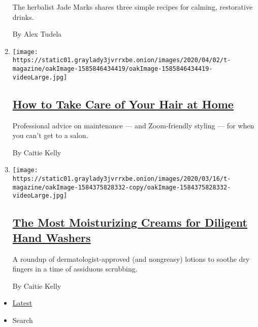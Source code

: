 \begin{enumerate}
  The herbalist Jade Marks shares three simple recipes for calming,
  restorative drinks.

  By Alex Tudela
\item
  \texttt{[image: https://static01.graylady3jvrrxbe.onion/images/2020/04/02/t-magazine/oakImage-1585846434419/oakImage-1585846434419-videoLarge.jpg]}

  \hypertarget{how-to-take-care-of-your-hair-at-home}{%
  \subsection{\texorpdfstring{\href{/2020/04/02/t-magazine/home-hair-care-tips-coronavirus.html}{How
  to Take Care of Your Hair at
  Home}}{How to Take Care of Your Hair at Home}}\label{how-to-take-care-of-your-hair-at-home}}

  Professional advice on maintenance --- and Zoom-friendly styling ---
  for when you can't get to a salon.

  By Caitie Kelly
\item
  \texttt{[image: https://static01.graylady3jvrrxbe.onion/images/2020/03/16/t-magazine/oakImage-1584375828332-copy/oakImage-1584375828332-videoLarge.jpg]}

  \hypertarget{the-most-moisturizing-creams-for-diligent-hand-washers}{%
  \subsection{\texorpdfstring{\href{/2020/03/18/t-magazine/best-moisturizing-creams-lotion.html}{The
  Most Moisturizing Creams for Diligent Hand
  Washers}}{The Most Moisturizing Creams for Diligent Hand Washers}}\label{the-most-moisturizing-creams-for-diligent-hand-washers}}

  A roundup of dermatologist-approved (and nongreasy) lotions to soothe
  dry fingers in a time of assiduous scrubbing.

  By Caitie Kelly
\end{enumerate}

\begin{itemize}
\tightlist
\item
  \protect\hyperlink{stream-panel}{Latest}
\item
  Search
\end{itemize}

